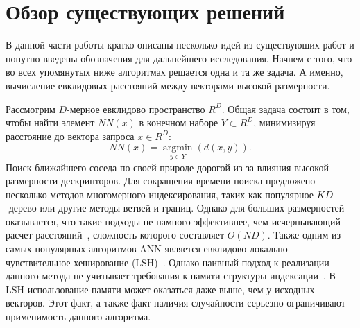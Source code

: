 \section{Обзор существующих решений}
\label{sec:Chapter2} 

В данной части работы кратко описаны несколько идей из существующих работ и попутно введены обозначения для дальнейшего исследования.
Начнем с того, что во всех упомянутых ниже алгоритмах решается одна и та же задача. А именно, вычисление евклидовых расстояний между векторами высокой размерности.

Рассмотрим $D$-мерное евклидово пространство $R^D$. Общая задача состоит в том, чтобы найти элемент  $NN(x)$ в конечном наборе $Y\subset R^D$, минимизируя расстояние до вектора запроса $x\in R^D$: 
$$NN(x) = \underset{y\in Y}{\operatorname{argmin}}(d(x, y)).$$
Поиск ближайшего соседа по своей природе дорогой из-за влияния высокой размерности дескрипторов. Для сокращения времени поиска предложено несколько методов многомерного индексирования, таких как популярное $KD$-дерево или другие методы ветвей и границ. Однако для больших размерностей оказывается, что такие подходы не намного эффективнее, чем исчерпывающий расчет расстояний~\cite{12}, сложность которого составляет $O(ND)$. Также одним из самых популярных алгоритмов ANN является евклидово локально-чувствительное хеширование (LSH)~\cite{9}. Однако наивный подход к реализации данного метода не учитывает требования к памяти структуры индексации~\cite{2}. В LSH использование памяти может оказаться даже выше, чем у исходных векторов. Этот факт, а также факт наличия случайности серьезно ограничивают применимость данного алгоритма.


